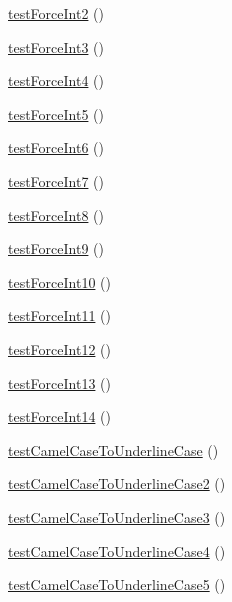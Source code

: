 \begin{CompactItemize}
\hyperlink{class_coruja_string_manipulation_test_52d30a5381c871aaa653d6509ff04e86}{testForceInt2} ()
\item 
\hyperlink{class_coruja_string_manipulation_test_d1694a0a9e26a7d7e67d23646e8a69a8}{testForceInt3} ()
\item 
\hyperlink{class_coruja_string_manipulation_test_dd64dad9b01f0a7a13252030089ee39b}{testForceInt4} ()
\item 
\hyperlink{class_coruja_string_manipulation_test_f122f743ccb289799fdf74a85a197056}{testForceInt5} ()
\item 
\hyperlink{class_coruja_string_manipulation_test_cbf475b9875a4f6fba120219b9be4855}{testForceInt6} ()
\item 
\hyperlink{class_coruja_string_manipulation_test_60d61c4ca1e3dc5ed97b58a592075cbb}{testForceInt7} ()
\item 
\hyperlink{class_coruja_string_manipulation_test_e6516654233581dabace64bd33858c44}{testForceInt8} ()
\item 
\hyperlink{class_coruja_string_manipulation_test_3912276169508fc05c0345e2a533c79d}{testForceInt9} ()
\item 
\hyperlink{class_coruja_string_manipulation_test_a5046ef7ceda55e25c509426591ec617}{testForceInt10} ()
\item 
\hyperlink{class_coruja_string_manipulation_test_443aee77ee9e70479a8b3ca19c7b0fd7}{testForceInt11} ()
\item 
\hyperlink{class_coruja_string_manipulation_test_c00aa102030546f5d06681b1ba8fa6d0}{testForceInt12} ()
\item 
\hyperlink{class_coruja_string_manipulation_test_5b51f50b312633754e5ee53c3c86efb3}{testForceInt13} ()
\item 
\hyperlink{class_coruja_string_manipulation_test_015889d37ccc0aeef9b0a4785e05244f}{testForceInt14} ()
\item 
\hyperlink{class_coruja_string_manipulation_test_67aeee0f177c1943fda00d85a21cf72a}{testCamelCaseToUnderlineCase} ()
\item 
\hyperlink{class_coruja_string_manipulation_test_f81b71fb9c2990dcc730540ae42ae84b}{testCamelCaseToUnderlineCase2} ()
\item 
\hyperlink{class_coruja_string_manipulation_test_28582182f36bf5c3b16b4abae513f484}{testCamelCaseToUnderlineCase3} ()
\item 
\hyperlink{class_coruja_string_manipulation_test_831b1d10e8ebec07238c2149417df3b5}{testCamelCaseToUnderlineCase4} ()
\item 
\hyperlink{class_coruja_string_manipulation_test_5472d5a7ebdb46d7730f415a7d4a9c8d}{testCamelCaseToUnderlineCase5} ()

\end{CompactItemize}
